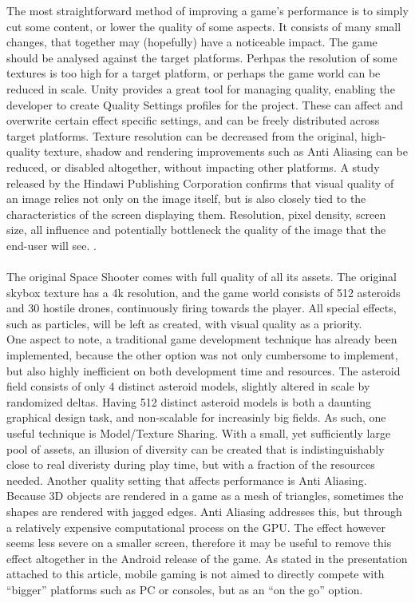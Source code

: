 The most straightforward method of improving a game's performance is to simply cut some content, or lower the quality of some aspects. It consists of many small changes, that together may (hopefully) have a noticeable impact. The game should be analysed against the target platforms. Perhpas the resolution of some textures is too high for a target platform, or perhaps the game world can be reduced in scale. Unity provides a great tool for managing quality, enabling the developer to create Quality Settings profiles for the project. These can affect and overwrite certain effect specific settings, and can be freely distributed across target platforms. Texture resolution can be decreased from the original, high-quality texture, shadow and rendering improvements such as Anti Aliasing can be reduced, or disabled altogether, without impacting other platforms. A study released by the Hindawi Publishing Corporation confirms that visual quality of an image relies not only on the image itself, but is also closely tied to the characteristics of the screen displaying them. Resolution, pixel density, screen size, all influence and potentially bottleneck the quality of the image that the end-user will see. \cite{imgquality}. \\ \\
The original Space Shooter comes with full quality of all its assets. The original skybox texture has a 4k resolution, and the game world consists of 512 asteroids and 30 hostile drones, continuously firing towards the player. All special effects, such as particles, will be left as created, with visual quality as a priority. \\
One aspect to note, a traditional game development technique has already been implemented, because the other option was not only cumbersome to implement, but also highly inefficient on both development time and resources. The asteroid field consists of only 4 distinct asteroid models, slightly altered in scale by randomized deltas. Having 512 distinct asteroid models is both a daunting graphical design task, and non-scalable for increasinly big fields. As such, one useful technique is Model/Texture Sharing. With a small, yet sufficiently large pool of assets, an illusion of diversity can be created that is indistinguishably close to real diveristy during play time, but with a fraction of the resources needed.
Another quality setting that affects performance is Anti Aliasing. Because 3D objects are rendered in a game as a mesh of triangles, sometimes the shapes are rendered with jagged edges. Anti Aliasing addresses this, but through a relatively expensive computational process on the GPU. The effect however seems less severe on a smaller screen, therefore it may be useful to remove this effect altogether in the Android release of the game. As stated in the presentation attached to this article, mobile gaming is not aimed to directly compete with ``bigger'' platforms such as PC or consoles, but as an ``on the go'' option. 
